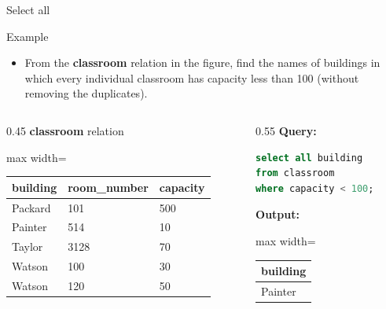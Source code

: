 \documentclass[aspectratio=169, xcolor=dvipsnames]{beamer}
\begin{document}
\begin{frame}[fragile]{Select all}
    \begin{exampleblock}{Example}
        \begin{itemize}[<+->]
            \item From the \textbf{classroom} relation in the figure, find the names of buildings in which every individual classroom has capacity less than 100 (without removing the duplicates).
        \end{itemize}
    \end{exampleblock}
    \begin{columns}
        \begin{column}{0.45\textwidth}
            \textbf{classroom} relation
            \begin{center}
                \begin{adjustbox}{max width=\textwidth}
                \begin{tabular}{|l|l|l|}
                \hline
                \textbf{building} & \textbf{room\_number} & \textbf{capacity} \\ \hline
                Packard & 101 & 500 \\ \hline
                Painter & 514 & 10 \\ \hline
                Taylor & 3128 & 70 \\ \hline
                Watson & 100 & 30 \\ \hline
                Watson & 120 & 50 \\ \hline
                \end{tabular}
                \end{adjustbox}
            \end{center}
        \end{column}
        \begin{column}{0.55\textwidth}
            \textbf{Query:}
            \begin{lstlisting}[language=SQL]
select all building 
from classroom 
where capacity < 100;
            \end{lstlisting}
            \textbf{Output:}
            \begin{center}
                \begin{adjustbox}{max width=\textwidth}
                \begin{tabular}{|l|}
                \hline
                \textbf{building} \\ \hline
                Painter \\ \hline

\end{tabular}
\end{adjustbox}
\end{center}
\end{column}
\end{columns}
\end{frame}
\end{document}
